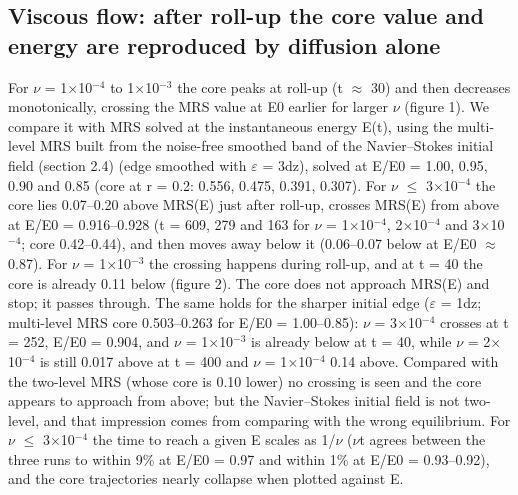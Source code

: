 \documentclass[11pt]{article}
\begin{document}
\subsection{Viscous flow: after roll-up the core value and energy are reproduced by diffusion alone}
For $\nu{}$ = 1$\times{}$10$^{-4}$ to 1$\times{}$10$^{-3}$ the core peaks at roll-up (t $\approx{}$ 30) and then decreases monotonically, crossing the MRS value at E0 earlier for larger $\nu{}$ (figure 1). We compare it with MRS solved at the instantaneous energy E(t), using the multi-level MRS built from the noise-free smoothed band of the Navier--Stokes initial field (section 2.4) (edge smoothed with $\varepsilon{}$ = 3dz), solved at E/E0 = 1.00, 0.95, 0.90 and 0.85 (core at r = 0.2: 0.556, 0.475, 0.391, 0.307). For $\nu{}$ $\le{}$ 3$\times{}$10$^{-4}$ the core lies 0.07--0.20 above MRS(E) just after roll-up, crosses MRS(E) from above at E/E0 = 0.916--0.928 (t = 609, 279 and 163 for $\nu{}$ = 1$\times{}$10$^{-4}$, 2$\times{}$10$^{-4}$ and 3$\times{}$10$^{-4}$; core 0.42--0.44), and then moves away below it (0.06--0.07 below at E/E0 $\approx{}$ 0.87). For $\nu{}$ = 1$\times{}$10$^{-3}$ the crossing happens during roll-up, and at t = 40 the core is already 0.11 below (figure 2). The core does not approach MRS(E) and stop; it passes through. The same holds for the sharper initial edge ($\varepsilon{}$ = 1dz; multi-level MRS core 0.503--0.263 for E/E0 = 1.00--0.85): $\nu{}$ = 3$\times{}$10$^{-4}$ crosses at t = 252, E/E0 = 0.904, and $\nu{}$ = 1$\times{}$10$^{-3}$ is already below at t = 40, while $\nu{}$ = 2$\times{}$10$^{-4}$ is still 0.017 above at t = 400 and $\nu{}$ = 1$\times{}$10$^{-4}$ 0.14 above. Compared with the two-level MRS (whose core is 0.10 lower) no crossing is seen and the core appears to approach from above; but the Navier--Stokes initial field is not two-level, and that impression comes from comparing with the wrong equilibrium. For $\nu{}$ $\le{}$ 3$\times{}$10$^{-4}$ the time to reach a given E scales as 1/$\nu{}$ ($\nu{}$t agrees between the three runs to within 9\% at E/E0 = 0.97 and within 1\% at E/E0 = 0.93--0.92), and the core trajectories nearly collapse when plotted against E.
\end{document}
